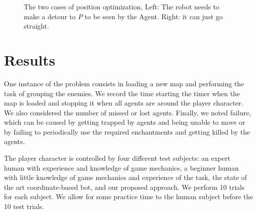 \documentclass[]{article}
\begin{document}
\begin{figure}
\caption{The two cases of position optimization, Left: The robot needs to make a detour to $P$ to be seen by the Agent. Right: it can just go straight.}
\label{fig:opt}
\end{figure}

\newpage
\section{Results}
One instance of the problem consists in loading a new map and performing the task of grouping the enemies. We record the time starting the timer when the map is loaded and stopping it when all agents are around the player character. We also considered the number of missed or lost agents. Finally, we noted failure, which can be caused by getting trapped by agents and being unable to move or by failing to periodically use the required enchantments and getting killed by the agents.

The player character is controlled by four different test subjects: an expert human with experience and knowledge of game mechanics, a beginner human with little knowledge of game mechanics and experience of the task, the state of the art coordinate-based bot, and our proposed approach. We perform 10 trials for each subject. We allow for some practice time to the human subject before the 10 test trials.
\end{document}
